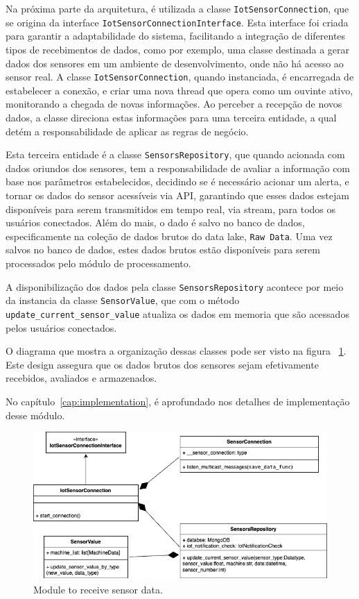 Na próxima parte da arquitetura, é utilizada a classe \texttt{IotSensorConnection}, que se origina da interface \texttt{IotSensorConnectionInterface}. Esta interface foi criada para garantir a adaptabilidade do sistema, facilitando a integração de diferentes tipos de recebimentos de dados, como por exemplo, uma classe destinada a gerar dados dos sensores em um ambiente de desenvolvimento, onde não há acesso ao sensor real. A classe \texttt{IotSensorConnection}, quando instanciada, é encarregada de estabelecer a conexão, e criar uma nova thread que opera como um ouvinte ativo, monitorando a chegada de novas informações. Ao perceber a recepção de novos dados, a classe direciona estas informações para uma terceira entidade, a qual detém a responsabilidade de aplicar as regras de negócio.

Esta terceira entidade é a classe \texttt{SensorsRepository}, que quando acionada com dados oriundos dos sensores, tem a responsabilidade de avaliar a informação com base nos parâmetros estabelecidos, decidindo se é necessário acionar um alerta, e tornar os dados do sensor acessíveis via \gls{API}, garantindo que esses dados estejam disponíveis para serem transmitidos em tempo real, via stream, para todos os usuários conectados. Além do mais, o dado é salvo no banco de dados, especificamente na coleção de dados brutos do data lake, \texttt{Raw Data}. Uma vez salvos no banco de dados, estes dados brutos estão disponíveis para serem processados pelo módulo de processamento.

A disponibilização dos dados pela classe \texttt{SensorsRepository} acontece por meio da instancia da classe \texttt{SensorValue}, que com o método \texttt{update\_current\_sensor\_value} atualiza os dados em memoria que são acessados pelos usuários conectados.

O diagrama que mostra a organização dessas classes pode ser visto na figura ~\ref{fig:receiveData}. Este design assegura que os dados brutos dos sensores sejam efetivamente recebidos, avaliados e armazenados.

No capítulo~\ref{cap:implementation}, é aprofundado nos detalhes de implementação desse módulo.


\begin{figure}[htbp]
	\centering
	\includegraphics[width=\textwidth]{images/recebimento_dados.png}
	\caption{Module to receive sensor data.}
	\label{fig:receiveData}
\end{figure}


